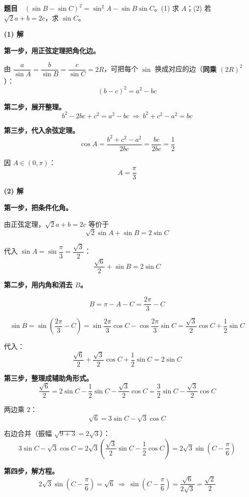 \par\medskip



\textbf{题目}　$(\sin B-\sin C)^{2}=\sin^{2}A-\sin B\sin C$。(1) 求 $A$；(2) 若 $\sqrt2a+b=2c$，求 $\sin C$。

\par\medskip

\textbf{(1) 解}

\textbf{第一步，用正弦定理把角化边。}

由 $\dfrac a{\sin A}=\dfrac b{\sin B}=\dfrac c{\sin C}=2R$，可把每个 $\sin$ 换成对应的边（\textbf{同乘 $(2R)^{2}$}）：
\[(b-c)^{2}=a^{2}-bc\]

\textbf{第二步，展开整理。}
\[b^{2}-2bc+c^{2}=a^{2}-bc\ \Longrightarrow\ b^{2}+c^{2}-a^{2}=bc\]

\textbf{第三步，代入余弦定理。}
\[\cos A=\frac{b^{2}+c^{2}-a^{2}}{2bc}=\frac{bc}{2bc}=\frac12\]

因 $A\in(0,\pi)$：
\[A=\frac\pi3\]

\par\medskip

\textbf{(2) 解}

\textbf{第一步，把条件化角。}

由正弦定理，$\sqrt2a+b=2c$ 等价于
\[\sqrt2\sin A+\sin B=2\sin C\]

代入 $\sin A=\sin\dfrac\pi3=\dfrac{\sqrt3}2$：
\[\frac{\sqrt6}2+\sin B=2\sin C\]

\textbf{第二步，用内角和消去 $B$。}

\[B=\pi-A-C=\frac{2\pi}3-C\]

\[\sin B=\sin\left(\frac{2\pi}3-C\right)=\sin\frac{2\pi}3\cos C-\cos\frac{2\pi}3\sin C=\frac{\sqrt3}2\cos C+\frac12\sin C\]

代入：
\[\frac{\sqrt6}2+\frac{\sqrt3}2\cos C+\frac12\sin C=2\sin C\]

\textbf{第三步，整理成辅助角形式。}
\[\frac{\sqrt6}2=2\sin C-\frac12\sin C-\frac{\sqrt3}2\cos C=\frac32\sin C-\frac{\sqrt3}2\cos C\]

两边乘 $2$：
\[\sqrt6=3\sin C-\sqrt3\cos C\]

右边合并（振幅 $\sqrt{9+3}=2\sqrt3$）：
\[3\sin C-\sqrt3\cos C=2\sqrt3\left(\frac{\sqrt3}2\sin C-\frac12\cos C\right)=2\sqrt3\sin\left(C-\frac\pi6\right)\]

\textbf{第四步，解方程。}
\[2\sqrt3\sin\left(C-\frac\pi6\right)=\sqrt6\ \Longrightarrow\ \sin\left(C-\frac\pi6\right)=\frac{\sqrt6}{2\sqrt3}=\frac{\sqrt2}2\]

